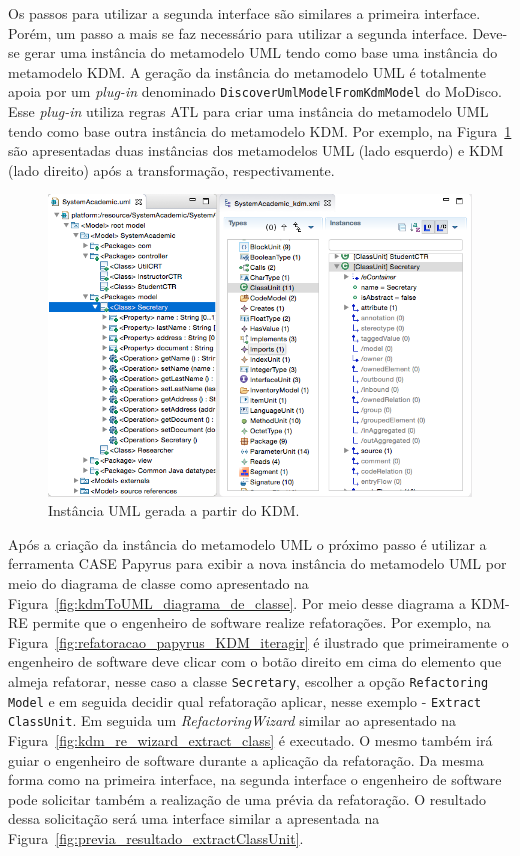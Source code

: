 Os passos para utilizar a segunda interface são similares a primeira interface. Porém, um passo a mais se faz necessário para utilizar a segunda interface. Deve-se gerar uma instância do metamodelo UML tendo como base uma instância do metamodelo KDM. A geração da instância do metamodelo UML é totalmente apoia por um \textit{plug-in} denominado \texttt{DiscoverUmlModelFromKdmModel} do MoDisco. Esse \textit{plug-in} utiliza regras ATL para criar uma instância do metamodelo UML tendo como base outra instância do metamodelo KDM. Por exemplo, na Figura~\ref{fig:kdmToUML} são apresentadas duas instâncias dos metamodelos UML (lado esquerdo) e KDM (lado direito) após a transformação, respectivamente.

\begin{figure}[!h]
	\centering
	\caption{Instância UML gerada a partir do KDM.}
	\label{fig:kdmToUML}
	\includegraphics[scale=0.5]{images/kdmToUML}
	\fautor
\end{figure}

Após a criação da instância do metamodelo UML o próximo passo é utilizar a ferramenta CASE Papyrus para exibir a nova instância do metamodelo UML por meio do diagrama de classe como apresentado na Figura~\ref{fig:kdmToUML_diagrama_de_classe}. Por meio desse diagrama a KDM-RE permite que o engenheiro de software realize refatorações. Por exemplo, na Figura~\ref{fig:refatoracao_papyrus_KDM_iteragir} é ilustrado que primeiramente o engenheiro de software deve clicar com o botão direito em cima do elemento que almeja refatorar, nesse caso a classe \texttt{Secretary}, escolher a opção \texttt{Refactoring Model} e em seguida decidir qual refatoração aplicar, nesse exemplo - \texttt{Extract ClassUnit}. Em seguida um \textit{RefactoringWizard} similar ao apresentado na Figura~\ref{fig:kdm_re_wizard_extract_class} é executado. O mesmo também irá guiar o engenheiro de software durante a aplicação da refatoração. Da mesma forma como na primeira interface, na segunda interface o engenheiro de software pode solicitar também a realização de uma prévia da refatoração. O resultado dessa solicitação será uma interface similar a apresentada na Figura~\ref{fig:previa_resultado_extractClassUnit}.

